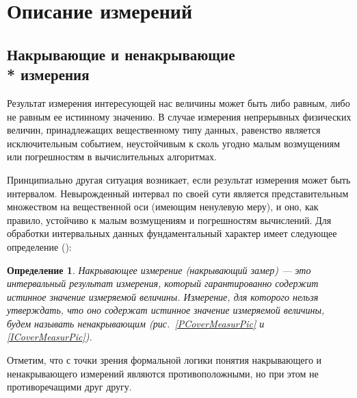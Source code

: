 \documentclass[a5paper,openany]{book}
\newtheorem{definition}{Определение}[section]
\begin{document}
{{	\section{Описание измерений}
	
\subsection{Накрывающие и ненакрывающие \\* измерения} 
\label{CoverMeasrSect} 

Результат измерения интересующей нас величины может быть либо равным, либо не равным ее истинному значению.
В случае измерения непрерывных физических величин, принадлежащих вещественному типу данных, равенство 
является исключительным событием,  неустойчивым к сколь угодно малым возмущениям или погрешностям в вычислительных алгоритмах. 

Принципиально другая ситуация возникает, если результат измерения может быть интервалом. 
Невырожденный интервал по своей сути является  представительным множеством на  
вещественной оси (имеющим ненулевую меру), и оно, как правило, устойчиво к малым возмущениям и 
погрешностям вычислений. Для обработки интервальных данных 
фундаментальный характер имеет следующее определение (\cite{MetodikaBook, Enclosing2022}):
\begin{definition}
	\textsl{Накрывающее измерение} (накрывающий замер) --- это интервальный результат 
	измерения, который гарантированно содержит истинное значение измеряемой величины. 
	Измерение, для которого нельзя утверждать, что оно содержат истинное значение 
	измеряемой величины, будем называть \textsl{ненакрывающим} (рис.~\ref{PCoverMeasurPic} 
	и \ref{ICoverMeasurPic}).  
\end{definition}

Отметим, что с точки зрения формальной логики понятия накрывающего и ненакрывающего 
измерений являются противоположными, но при этом не противоречащими друг другу. 


}}
\end{document}
